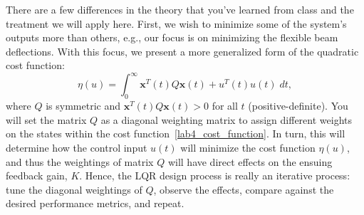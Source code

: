 \begin{enumerate}
\begin{enumerate}
                    \vspace{0.5em}
                    There are a few differences in the theory that you've learned from class and the treatment we will apply here. First, we wish to minimize some of the system's outputs more than others, e.g., our focus is on minimizing the flexible beam deflections. With this focus, we present a more generalized form of the quadratic cost function:
                    \begin{equation}\label{lab4_cost_function}
                        \eta(u) = \int_0^{\infty} \mathbf{x}^T(t) Q \mathbf{x}(t) + u^T(t)u(t) \; dt,
                    \end{equation}
                    where $Q$ is symmetric and $\mathbf{x}^T(t) Q \mathbf{x}(t) > 0$ for all $t$ (positive-definite). You will set the matrix $Q$ as a diagonal weighting matrix to assign different weights on the states within the cost function~\eqref{lab4_cost_function}. In turn, this will determine how the control input $u(t)$ will minimize the cost function $\eta(u)$, and thus the weightings of matrix $Q$ will have direct effects on the ensuing feedback gain, $K$. Hence, the LQR design process is really an iterative process: tune the diagonal weightings of $Q$, observe the effects, compare against the desired performance metrics, and repeat.


\end{enumerate}
\end{enumerate}
